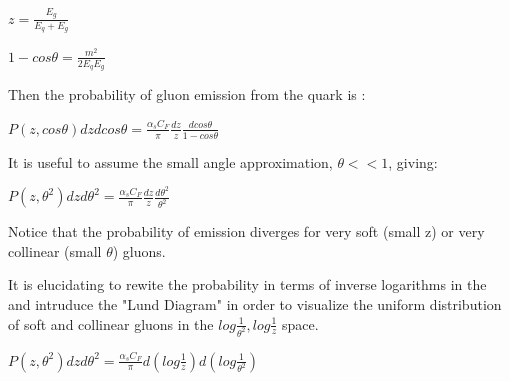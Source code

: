 $z = \frac{E_g}{E_q + E_g}$\newline

$1 - cos \theta = \frac{m^2}{2 E_q E_g}$\newline

Then the probability of gluon emission from the quark is :


$P(z,cos \theta) dz d cos \theta = \frac{\alpha_s C_F}{\pi}  \frac{dz}{z} \frac{dcos \theta}{1 - cos \theta}  $\newline

It is useful to assume the small angle approximation, $\theta << 1$, giving:\newline


$P(z,\theta^2) dz d \theta^2 = \frac{\alpha_s C_F}{\pi}  \frac{dz}{z} \frac{d \theta^2}{ \theta^2}  $\newline

Notice that the probability of emission diverges for very soft (small z) or very collinear (small $\theta$) gluons.

It is elucidating to rewite the probability in terms of inverse logarithms in the and intruduce the "Lund Diagram" in order to visualize the uniform distribution of soft and collinear gluons in the $log \frac{1}{ \theta^2} , log\frac{1}{z} $ space.



$P(z,\theta^2) dz d \theta^2 = \frac{\alpha_s C_F}{\pi} d( log\frac{1}{z}  ) d(log \frac{1}{ \theta^2})  $\newline




